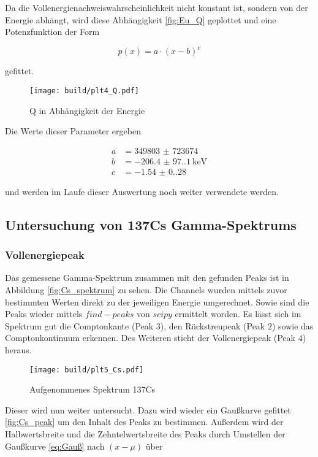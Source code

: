 Da die Vollenergienachweiswahrscheinlichkeit nicht konstant ist, sondern von
der Energie abhängt, wird diese Abhängigkeit \eqref{fig:Eu_Q} geplottet und
eine Potenzfunktion der Form

\begin{equation}
	p(x)=a \cdot (x-b)^c
\end{equation}

gefittet.

\begin{figure}[H]
	\centering
	\texttt{[image: build/plt4\_Q.pdf]}
	\caption{Q in Abhängigkeit der Energie}
	\label{fig:Eu_Q}
\end{figure}

Die Werte dieser Parameter ergeben

\begin{align*}
	a & =\num{349803(723674)}         \\
	b & =\qty{-206.4(97.1)}{\kilo\eV} \\
	c & =\num{-1.54(0.28)}
\end{align*}

und werden im Laufe dieser Auswertung noch weiter verwendete werden.

\subsection{Untersuchung von 137Cs Gamma-Spektrums}
\subsubsection{Vollenergiepeak}
Das gemessene Gamma-Spektrum zusammen mit den gefunden Peaks ist in Abbildung
\eqref{fig:Cs_spektrum} zu sehen. Die Channels wurden mittels zuvor bestimmten
Werten direkt zu der jeweiligen Energie umgerechnet. Sowie sind die Peaks
wieder mittels $find-peaks$ von $scipy$ \cite{scipy} ermittelt worden. Es lässt
sich im Spektrum gut die Comptonkante (Peak $3$), den Rückstreupeak (Peak $2$)
sowie das Comptonkontinuum erkennen. Des Weiteren sticht der Vollenergiepeak
(Peak $4$) heraus.

\begin{figure}[H]
	\centering
	\texttt{[image: build/plt5\_Cs.pdf]}
	\caption{Aufgenommenes Spektrum 137Cs}
	\label{fig:Cs_spektrum}
\end{figure}

Dieser wird nun weiter untersucht. Dazu wird wieder ein Gaußkurve gefittet
\eqref{fig:Cs_peak} um den Inhalt des Peaks zu bestimmen. Außerdem wird der
Halbwertsbreite und die Zehntelwertsbreite des Peaks durch Umstellen der
Gaußkurve \eqref{eq:Gauß} nach $(x-\mu)$ über

